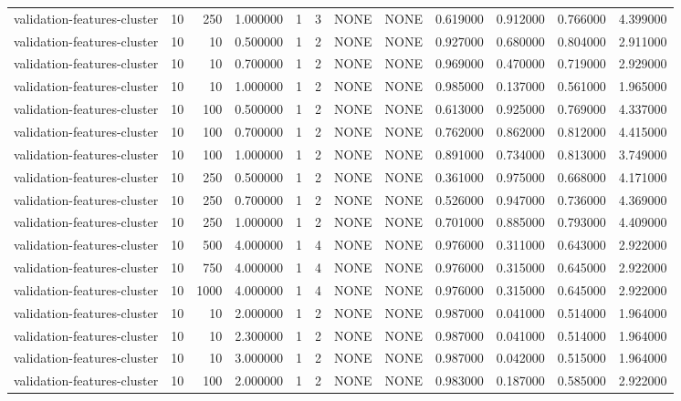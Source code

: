 \begin{tabular}{lrrrllllrrrr}
validation-features-cluster & 10 & 250 & 1.000000 & 1 & 3 & NONE & NONE & 0.619000 & 0.912000 & 0.766000 & 4.399000 \\
validation-features-cluster & 10 & 10 & 0.500000 & 1 & 2 & NONE & NONE & 0.927000 & 0.680000 & 0.804000 & 2.911000 \\
validation-features-cluster & 10 & 10 & 0.700000 & 1 & 2 & NONE & NONE & 0.969000 & 0.470000 & 0.719000 & 2.929000 \\
validation-features-cluster & 10 & 10 & 1.000000 & 1 & 2 & NONE & NONE & 0.985000 & 0.137000 & 0.561000 & 1.965000 \\
validation-features-cluster & 10 & 100 & 0.500000 & 1 & 2 & NONE & NONE & 0.613000 & 0.925000 & 0.769000 & 4.337000 \\
validation-features-cluster & 10 & 100 & 0.700000 & 1 & 2 & NONE & NONE & 0.762000 & 0.862000 & 0.812000 & 4.415000 \\
validation-features-cluster & 10 & 100 & 1.000000 & 1 & 2 & NONE & NONE & 0.891000 & 0.734000 & 0.813000 & 3.749000 \\
validation-features-cluster & 10 & 250 & 0.500000 & 1 & 2 & NONE & NONE & 0.361000 & 0.975000 & 0.668000 & 4.171000 \\
validation-features-cluster & 10 & 250 & 0.700000 & 1 & 2 & NONE & NONE & 0.526000 & 0.947000 & 0.736000 & 4.369000 \\
validation-features-cluster & 10 & 250 & 1.000000 & 1 & 2 & NONE & NONE & 0.701000 & 0.885000 & 0.793000 & 4.409000 \\
validation-features-cluster & 10 & 500 & 4.000000 & 1 & 4 & NONE & NONE & 0.976000 & 0.311000 & 0.643000 & 2.922000 \\
validation-features-cluster & 10 & 750 & 4.000000 & 1 & 4 & NONE & NONE & 0.976000 & 0.315000 & 0.645000 & 2.922000 \\
validation-features-cluster & 10 & 1000 & 4.000000 & 1 & 4 & NONE & NONE & 0.976000 & 0.315000 & 0.645000 & 2.922000 \\
validation-features-cluster & 10 & 10 & 2.000000 & 1 & 2 & NONE & NONE & 0.987000 & 0.041000 & 0.514000 & 1.964000 \\
validation-features-cluster & 10 & 10 & 2.300000 & 1 & 2 & NONE & NONE & 0.987000 & 0.041000 & 0.514000 & 1.964000 \\
validation-features-cluster & 10 & 10 & 3.000000 & 1 & 2 & NONE & NONE & 0.987000 & 0.042000 & 0.515000 & 1.964000 \\
validation-features-cluster & 10 & 100 & 2.000000 & 1 & 2 & NONE & NONE & 0.983000 & 0.187000 & 0.585000 & 2.922000 \\

\end{tabular}
